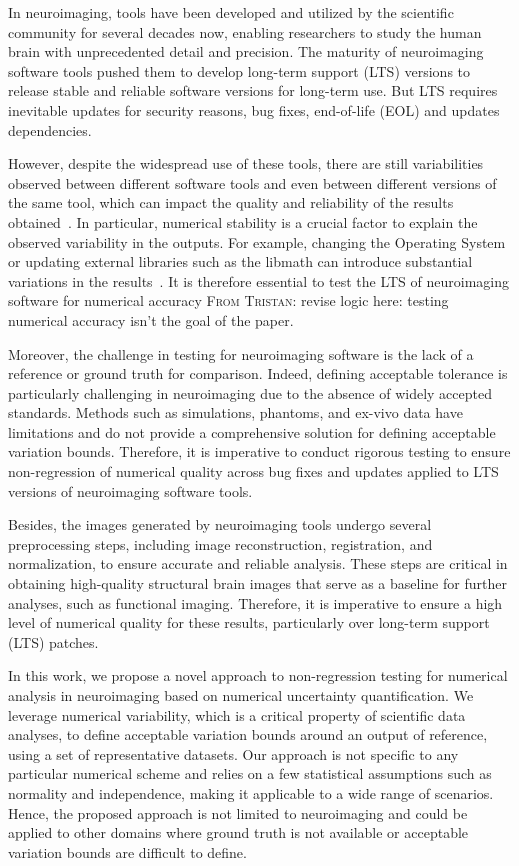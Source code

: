 \documentclass{article}
\newcommand{\TG}[1]{\color{blue}\textsc{From Tristan:} #1\color{black}\xspace}
\begin{document}
In neuroimaging, tools have been developed and utilized by the scientific community for several decades now, enabling researchers to study the human brain with unprecedented detail and precision.  The maturity of neuroimaging software tools pushed them to develop long-term support (LTS) versions
to release stable and reliable software versions for long-term use. But LTS requires inevitable updates for security reasons, bug fixes, end-of-life (EOL) and updates dependencies.

However, despite the widespread use of these tools, there are still variabilities observed between different software tools and even between different versions of the same tool, which can impact the quality and reliability of the results obtained~\cite{glatard2015reproducibility, kiar2021numerical,bhagwat2021understanding}. In particular, numerical stability is a crucial factor to explain the observed variability in the outputs. For example, changing the Operating System or updating external libraries such as the libmath can introduce substantial variations in the results~\cite{salari2021accurate}.
 It is therefore essential to test the LTS of neuroimaging software for numerical accuracy \TG{revise logic here: testing numerical accuracy isn't the goal of the paper}.

Moreover, the challenge in testing for neuroimaging software is the lack of a reference or ground truth for comparison. Indeed, defining acceptable tolerance is particularly challenging in neuroimaging due to the absence of widely accepted standards. Methods such as simulations, phantoms, and ex-vivo data have limitations and do not provide a comprehensive solution for defining acceptable variation bounds. Therefore, it is imperative to conduct rigorous testing to ensure non-regression of numerical quality across bug fixes and updates applied to LTS versions of neuroimaging software tools.

Besides, the images generated by neuroimaging tools undergo several preprocessing steps, including image reconstruction, registration, and normalization, to ensure accurate and reliable analysis. These steps are critical in obtaining high-quality structural brain images that serve as a baseline for further analyses, such as functional imaging. Therefore, it is imperative to ensure a high level of numerical quality for these results, particularly over long-term support (LTS) patches.

In this work, we propose a novel approach to non-regression testing for numerical analysis in neuroimaging based on numerical uncertainty quantification. We leverage numerical variability, which is a critical property of scientific data analyses, to define acceptable variation bounds around an output of reference, using a set of representative datasets. Our approach is not specific to any particular numerical scheme and relies on a few statistical assumptions such as normality and independence, making it applicable to a wide range of scenarios. Hence, the proposed approach is not limited to neuroimaging and could be applied to other domains where ground truth is not available or acceptable variation bounds are difficult to define.
\end{document}
